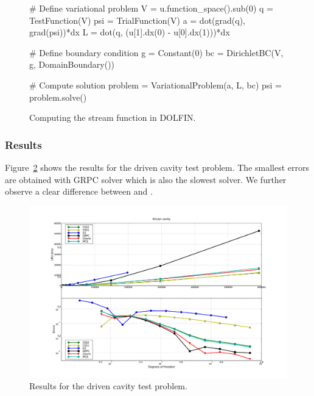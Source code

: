 \begin{figure}[htbp]
  \codesize
  \begin{center}
    \begin{python}
# Define variational problem
V   = u.function_space().sub(0)
q   = TestFunction(V)
psi = TrialFunction(V)
a   = dot(grad(q), grad(psi))*dx
L   = dot(q, (u[1].dx(0) - u[0].dx(1)))*dx

# Define boundary condition
g  = Constant(0)
bc = DirichletBC(V, g, DomainBoundary())

# Compute solution
problem = VariationalProblem(a, L, bc)
psi = problem.solve()
    \end{python}
    \caption{Computing the stream function in DOLFIN.}
    \label{fig:streamfunction}
  \end{center}
\end{figure}

\subsubsection{Results}

Figure~\ref{fig:drivencavity_CPU_and_errors} shows the results for the
driven cavity test problem.  The smallest errors are obtained with
GRPC solver which is also the slowest solver. We further observe a
clear difference between  and .

\begin{figure}
  \begin{center}
    \includegraphics[width=14cm]{chapters/kvs-1/pdf/new_drivencavity_res.pdf}
  \end{center}
  \caption{Results for the driven cavity test problem.}
  \label{fig:drivencavity_CPU_and_errors}
\end{figure}

